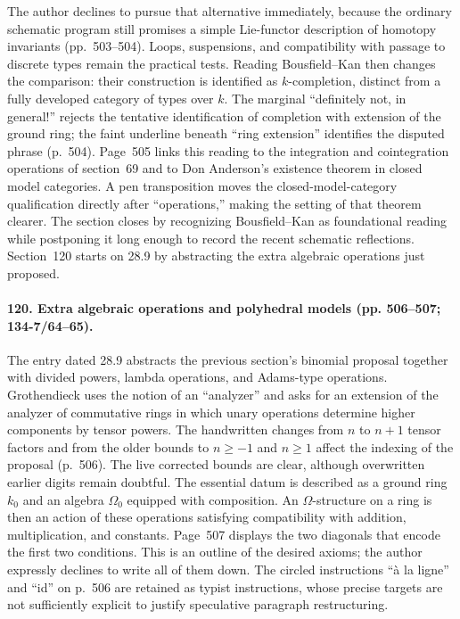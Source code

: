 The author declines to pursue that alternative immediately, because the ordinary schematic program still promises a simple Lie-functor description of homotopy invariants (pp.~503--504). Loops, suspensions, and compatibility with passage to discrete types remain the practical tests. Reading Bousfield--Kan then changes the comparison: their construction is identified as $k$-completion, distinct from a fully developed category of types over $k$. The marginal ``definitely not, in general!'' rejects the tentative identification of completion with extension of the ground ring; the faint underline beneath ``ring extension'' identifies the disputed phrase (p.~504). Page~505 links this reading to the integration and cointegration operations of section~69 and to Don Anderson's existence theorem in closed model categories. A pen transposition moves the closed-model-category qualification directly after ``operations,'' making the setting of that theorem clearer. The section closes by recognizing Bousfield--Kan as foundational reading while postponing it long enough to record the recent schematic reflections. Section~120 starts on 28.9 by abstracting the extra algebraic operations just proposed.

\paragraph{120. Extra algebraic operations and polyhedral models (pp. 506--507; 134-7/64--65).}
The entry dated 28.9 abstracts the previous section's binomial proposal together with divided powers, lambda operations, and Adams-type operations. Grothendieck uses the notion of an ``analyzer'' and asks for an extension of the analyzer of commutative rings in which unary operations determine higher components by tensor powers. The handwritten changes from $n$ to $n+1$ tensor factors and from the older bounds to $n\geq-1$ and $n\geq1$ affect the indexing of the proposal (p.~506). The live corrected bounds are clear, although overwritten earlier digits remain doubtful. The essential datum is described as a ground ring $k_0$ and an algebra $\Omega_0$ equipped with composition. An $\Omega$-structure on a ring is then an action of these operations satisfying compatibility with addition, multiplication, and constants. Page~507 displays the two diagonals that encode the first two conditions. This is an outline of the desired axioms; the author expressly declines to write all of them down. The circled instructions ``\`a la ligne'' and ``id'' on p.~506 are retained as typist instructions, whose precise targets are not sufficiently explicit to justify speculative paragraph restructuring.

